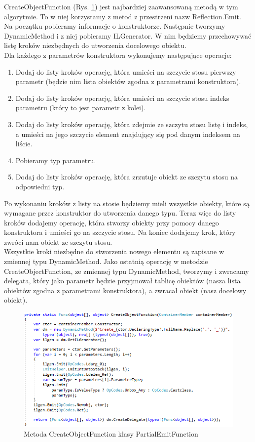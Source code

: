 \documentclass[12pt]{article}
\begin{document}
CreateObjectFunction (Rys. \ref{fig:PartialEmitFunction_CreateObjectFunction}) jest najbardziej zaawansowaną metodą w tym algorytmie. To w niej korzystamy z metod z przestrzeni nazw Reflection.Emit.\\
Na początku pobieramy informacje o konstruktorze. Następnie tworzymy DynamicMethod i z niej pobieramy ILGenerator. W nim będziemy przechowywać listę kroków niezbędnych do utworzenia docelowego obiektu.\\
Dla każdego z parametrów konstruktora wykonujemy następujące operacje:
\begin{enumerate}
	\item Dodaj do listy kroków operację, która umieści na szczycie stosu pierwszy parametr (będzie nim lista obiektów zgodna z parametrami konstruktora).
	\item Dodaj do listy kroków operację, która umieści na szczycie stosu indeks parametru (który to jest parametr z kolei).
	\item Dodaj do listy kroków operację, która zdejmie ze szczytu stosu listę i indeks, a umieści na jego szczycie element znajdujący się pod danym indeksem na liście.
	\item Pobieramy typ parametru.
	\item Dodaj do listy kroków operację, która zrzutuje obiekt ze szczytu stosu na odpowiedni typ.
\end{enumerate}
Po wykonaniu kroków z listy na stosie będziemy mieli wszystkie obiekty, które są wymagane przez konstruktor do utworzenia danego typu. Teraz więc do listy kroków dodajemy operację, która stworzy obiekty przy pomocy danego konstruktora i umieści go na szczycie stosu. Na koniec dodajemy krok, który zwróci nam obiekt ze szczytu stosu.\\
Wszystkie kroki niezbędne do stworzenia nowego elementu są zapisane w zmiennej typu DynamicMethod. Jako ostatnią operację w metodzie CreateObjectFunction, ze zmiennej typu DynamicMethod, tworzymy i zwracamy delegata, który jako parametr będzie przyjmował tablicę obiektów (nasza lista obiektów zgodna z parametrami konstruktora), a zwracał obiekt (nasz docelowy obiekt).\\
\begin{figure}[H]
	\begin{center}
  		\includegraphics{PartialEmitFunction_CreateObjectFunction.png}
  		\caption{Metoda CreateObjectFunction klasy PartialEmitFunction}
  		\label{fig:PartialEmitFunction_CreateObjectFunction}
	\end{center}
\end{figure}
\end{document}
